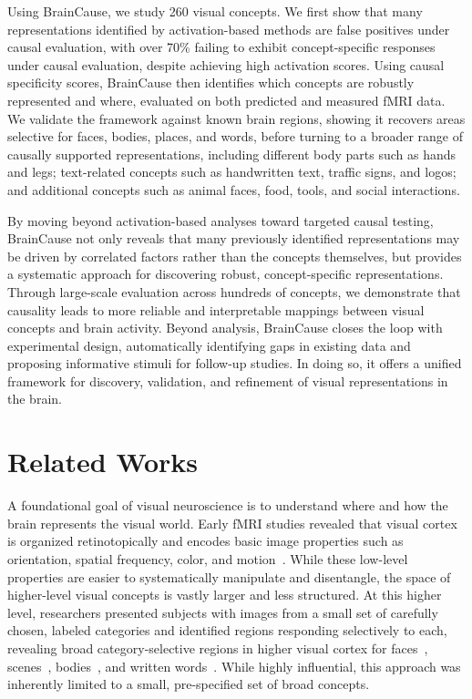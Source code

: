 \documentclass{llmxive}
\begin{document}
Using BrainCause, we study 260 visual concepts. We first show that many representations identified by activation-based methods are false positives under causal evaluation, with over 70\% failing to exhibit concept-specific responses under causal evaluation, despite achieving high activation scores. Using causal specificity scores, BrainCause then identifies which concepts are robustly represented and where, evaluated on both predicted and measured fMRI data. We validate the framework against known brain regions, showing it recovers areas selective for faces, bodies, places, and words, before turning to a broader range of causally supported representations, including different body parts such as hands and legs; text-related concepts such as handwritten text, traffic signs, and logos; and additional concepts such as animal faces, food, tools, and social interactions.


By moving beyond activation-based analyses toward targeted causal testing, BrainCause not only reveals that many previously identified representations may be driven by correlated factors rather than the concepts themselves, but provides a systematic approach for discovering robust, concept-specific representations. Through large-scale evaluation across hundreds of concepts, we demonstrate that causality leads to more reliable and interpretable mappings between visual concepts and brain activity. Beyond analysis, BrainCause closes the loop with experimental design, automatically identifying gaps in existing data and proposing informative stimuli for follow-up studies. In doing so, it offers a unified framework for discovery, validation, and refinement of visual representations in the brain.





\vspace{-0.15cm}
\section{Related Works}
\vspace{-0.15cm}


A foundational goal of visual neuroscience is to understand where and how the brain represents the visual world. Early fMRI studies revealed that visual cortex is organized retinotopically and encodes basic image properties such as orientation, spatial frequency, color, and motion~\cite{Sereno1995Science, Engel1997CerebCortex, DeYoe1996PNAS, Kamitani2005NatNeurosci, Henriksson2008JOV, Conway2007Neuron, Tootell1995Nature}. While these low-level properties are easier to systematically manipulate and disentangle, the space of higher-level visual concepts is vastly larger and less structured. At this higher level, researchers presented subjects with images from a small set of carefully chosen, labeled categories and identified regions responding selectively to each, revealing broad category-selective regions in higher visual cortex for faces~\cite{kanwisher2006fusiform}, scenes~\cite{epstein2019scene}, bodies~\cite{downing2001cortical}, and written words~\cite{cohen2000visual}. While highly influential, this approach was inherently limited to a small, pre-specified set of broad concepts.
\end{document}
